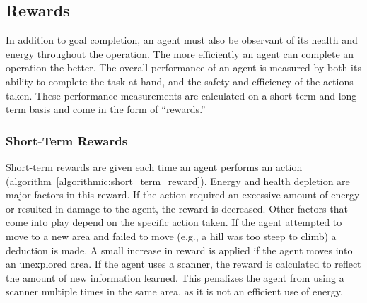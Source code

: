 \subsection{Rewards} \label{subsec:rewards}
In addition to goal completion, an agent must also be observant of its health and energy throughout the operation.
The more efficiently an agent can complete an operation the better.
The overall performance of an agent is measured by both its ability to complete the task at hand, and the safety and efficiency of the actions taken.
These performance measurements are calculated on a short-term and long-term basis and come in the form of ``rewards.''

\subsubsection{Short-Term Rewards}
Short-term rewards are given each time an agent performs an action (algorithm~\ref{algorithmic:short_term_reward}).
Energy and health depletion are major factors in this reward.
If the action required an excessive amount of energy or resulted in damage to the agent, the reward is decreased.
Other factors that come into play depend on the specific action taken.
If the agent attempted to move to a new area and failed to move (e.g., a hill was too steep to climb) a deduction is made.
A small increase in reward is applied if the agent moves into an unexplored area.
If the agent uses a scanner, the reward is calculated to reflect the amount of new information learned.
This penalizes the agent from using a scanner multiple times in the same area, as it is not an efficient use of energy.

